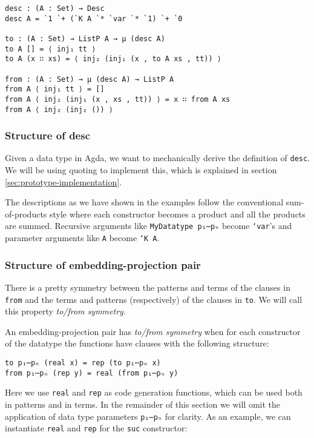 \begin{verbatim}
desc : (A : Set) → Desc
desc A = `1 `+ (`K A `* `var `* `1) `+ `0

to : (A : Set) → ListP A → μ (desc A)
to A [] = ⟨ inj₁ tt ⟩
to A (x ∷ xs) = ⟨ inj₂ (inj₁ (x , to A xs , tt)) ⟩

from : (A : Set) → μ (desc A) → ListP A
from A ⟨ inj₁ tt ⟩ = []
from A ⟨ inj₂ (inj₁ (x , xs , tt)) ⟩ = x ∷ from A xs
from A ⟨ inj₂ (inj₂ ()) ⟩
\end{verbatim}

\subsubsection{Structure of desc}

Given a data type in Agda, we want to mechanically derive the
definition of \texttt{desc}.
We will be using quoting to implement this, which is explained in
section \ref{sec:prototype-implementation}.

The descriptions as we have shown in the examples follow the
conventional sum-of-products style where each constructor becomes a
product and all the products are summed.
Recursive arguments like \texttt{MyDatatype p₁⋯pₙ} become
\texttt{`var}'s and parameter arguments like \texttt{A} become
\texttt{`K A}.

\subsubsection{Structure of embedding-projection pair}

There is a pretty symmetry between the patterns and terms of the
clauses in \texttt{from} and the terms and patterns (respectively) of
the clauses in \texttt{to}.
We will call this property \emph{to/from symmetry}.

\begin{definition}
An embedding-projection pair has \emph{to/from symmetry} when for each
constructor of the datatype the functions have clauses with the
following structure:

\begin{verbatim}
to p₁⋯pₙ (real x) = rep (to p₁⋯pₙ x)
from p₁⋯pₙ (rep y) = real (from p₁⋯pₙ y)
\end{verbatim}
\end{definition}

Here we use \texttt{real} and \texttt{rep} as code generation
functions, which can be used both in patterns and in terms.
In the remainder of this section we will omit the application of data
type parameters \texttt{p₁⋯pₙ} for clarity.
As an example, we can instantiate \texttt{real} and \texttt{rep} for
the \texttt{suc} constructor:

